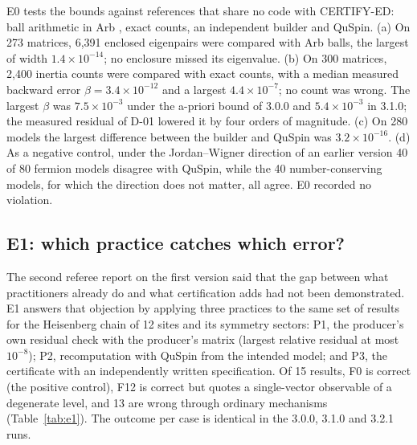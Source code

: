 \documentclass[11pt,a4paper]{article}
\begin{document}
E0 tests the bounds against references that share no code with CERTIFY-ED: ball arithmetic in Arb
\cite{Johansson2017}, exact counts, an independent builder and QuSpin. (a) On 273 matrices, 6,391 enclosed eigenpairs
were compared with Arb balls, the largest of width $1.4\times10^{-14}$; no enclosure missed its eigenvalue. (b) On 300
matrices, 2,400 inertia counts were compared with exact counts, with a median measured backward error
$\beta=3.4\times10^{-12}$ and a largest $4.4\times10^{-7}$; no count was wrong. The largest $\beta$ was
$7.5\times10^{-3}$ under the a-priori bound of 3.0.0 and $5.4\times10^{-3}$ in 3.1.0; the measured residual of D-01
lowered it by four orders of magnitude. (c) On 280 models the largest difference between the builder and QuSpin was
$3.2\times10^{-16}$. (d) As a negative control, under the Jordan--Wigner direction of an earlier version 40 of 80
fermion models disagree with QuSpin, while the 40 number-conserving models, for which the direction does not matter,
all agree. E0 recorded no violation.

\subsection{E1: which practice catches which error?}

The second referee report on the first version said that the gap between what practitioners already do and what
certification adds had not been demonstrated. E1 answers that objection by applying three practices to the same set of
results for the Heisenberg chain of 12 sites and its symmetry sectors: P1, the producer's own residual check with the
producer's matrix (largest relative residual at most $10^{-8}$); P2, recomputation with QuSpin from the intended
model; and P3, the certificate with an independently written specification. Of 15 results, F0 is correct (the positive
control), F12 is correct but quotes a single-vector observable of a degenerate level, and 13 are wrong through
ordinary mechanisms (Table~\ref{tab:e1}). The outcome per case is identical in the 3.0.0, 3.1.0 and 3.2.1 runs.
\end{document}
